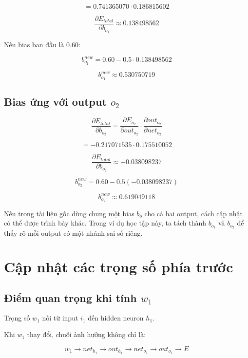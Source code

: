 \documentclass[12pt,a4paper]{report}
\begin{document}
\[
    =
    0.741365070
    \cdot
    0.186815602
\]

\[
    \frac{\partial E_{total}}{\partial b_{o_1}}
    \approx 0.138498562
\]

Nếu bias ban đầu là $0.60$:

\[
    b_{o_1}^{new}
    =
    0.60
    -
    0.5\cdot 0.138498562
\]

\[
    b_{o_1}^{new}
    \approx 0.530750719
\]

\section{Bias ứng với output $o_2$}

\[
    \frac{\partial E_{total}}{\partial b_{o_2}}
    =
    \frac{\partial E_{o_2}}{\partial out_{o_2}}
    \cdot
    \frac{\partial out_{o_2}}{\partial net_{o_2}}
\]

\[
    =
    -0.217071535
    \cdot
    0.175510052
\]

\[
    \frac{\partial E_{total}}{\partial b_{o_2}}
    \approx -0.038098237
\]

\[
    b_{o_2}^{new}
    =
    0.60
    -
    0.5(-0.038098237)
\]

\[
    b_{o_2}^{new}
    \approx 0.619049118
\]

\begin{luuy}
Nếu trong tài liệu gốc dùng chung một bias $b_o$ cho cả hai output, cách cập nhật có thể được trình bày khác. Trong ví dụ học tập này, ta tách thành $b_{o_1}$ và $b_{o_2}$ để thấy rõ mỗi output có một nhánh sai số riêng.
\end{luuy}

\chapter{Cập nhật các trọng số phía trước}

\section{Điểm quan trọng khi tính $w_1$}

Trọng số $w_1$ nối từ input $i_1$ đến hidden neuron $h_1$.

Khi $w_1$ thay đổi, chuỗi ảnh hưởng không chỉ là:

\[
    w_1
    \rightarrow
    net_{h_1}
    \rightarrow
    out_{h_1}
    \rightarrow
    net_{o_1}
    \rightarrow
    out_{o_1}
    \rightarrow
    E
\]
\end{document}
